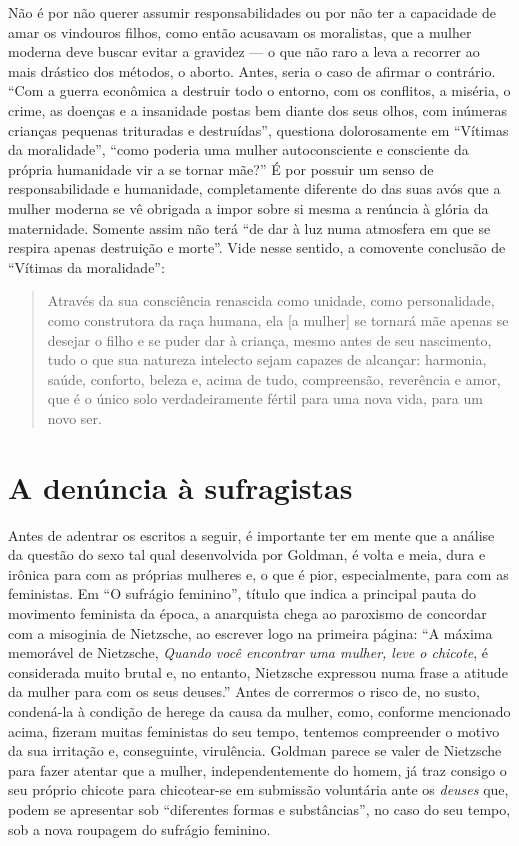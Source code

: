 Não é por não
querer assumir responsabilidades ou por não ter a capacidade de amar os
vindouros filhos, como então acusavam os moralistas, que a mulher
moderna deve buscar evitar a gravidez --- o que não raro a leva a
recorrer ao mais drástico dos métodos, o aborto. Antes, seria o caso de
afirmar o contrário. ``Com a guerra econômica a destruir todo o entorno,
com os conflitos, a miséria, o crime, as doenças e a insanidade postas
bem diante dos seus olhos, com inúmeras crianças pequenas trituradas e
destruídas'', questiona dolorosamente em ``Vítimas da moralidade'',
``como poderia uma mulher autoconsciente e consciente da própria
humanidade vir a se tornar mãe?'' É por possuir um senso de
responsabilidade e humanidade, completamente diferente do das suas avós
que a mulher moderna se vê obrigada a impor sobre si mesma a renúncia à
glória da maternidade. Somente assim não terá ``de dar à luz numa
atmosfera em que se respira apenas destruição e morte''. Vide nesse
sentido, a comovente conclusão de ``Vítimas da moralidade'':

\begin{quote}
Através da sua consciência renascida como unidade, como personalidade,
como construtora da raça humana, ela {[}a mulher{]} se tornará mãe
apenas se desejar o filho e se puder dar à criança, mesmo antes de seu
nascimento, tudo o que sua natureza intelecto sejam capazes de alcançar:
harmonia, saúde, conforto, beleza e, acima de tudo, compreensão,
reverência e amor, que é o único solo verdadeiramente fértil para uma
nova vida, para um novo ser.
\end{quote}

\section{A denúncia à sufragistas}

Antes de adentrar os escritos a seguir, é importante ter em mente que a
análise da questão do sexo tal qual desenvolvida por Goldman, é
volta e meia, dura e irônica para com as próprias mulheres e, o que é
pior, especialmente, para com as feministas. Em ``O sufrágio feminino'',
título que indica a principal pauta do movimento feminista da época, a
anarquista chega ao paroxismo de concordar com a misoginia de Nietzsche,
ao escrever logo na primeira página: ``A máxima memorável de Nietzsche,
\textit{Quando você encontrar uma mulher, leve o chicote}, é considerada muito
brutal e, no entanto, Nietzsche expressou numa frase a atitude da mulher
para com os seus deuses.'' Antes de corrermos o risco de, no susto,
condená-la à condição de herege da causa da mulher, como, conforme
mencionado acima, fizeram muitas feministas do seu tempo, tentemos
compreender o motivo da sua irritação e, conseguinte, virulência.
Goldman parece se valer de Nietzsche para fazer atentar que a mulher,
independentemente do homem, já traz consigo o seu próprio chicote para
chicotear-se em submissão voluntária ante os \textit{deuses} que, podem se
apresentar sob ``diferentes formas e substâncias'', no caso do seu
tempo, sob a nova roupagem do sufrágio feminino. 

